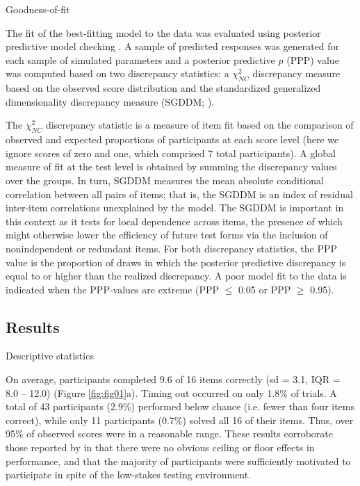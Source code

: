 \documentclass[a4paper,man,natbib]{apa6}
\makeatletter
\renewcommand{\subsubsection}{\@startsection{subsubsection}{3}
  {\z@}%
  {\b@level@two@skip}{\e@level@two@skip}%
  {\normalfont\normalsize\bfseries}}
\makeatother
\begin{document}
\subsubsection{Goodness-of-fit}

The fit of the best-fitting model to the data was evaluated using posterior predictive model checking \citep{gelman1996posterior, levy2017bayesian}. A sample of predicted responses was generated for each sample of simulated parameters and a posterior predictive $p$ (PPP) value was computed based on two discrepancy statistics: a $\chi^2_{NC}$ discrepancy measure based on the observed score distribution \citep{sinharay2006posterior} and the standardized generalized dimensionality discrepancy measure (SGDDM; \citealt{levy2015standardized}). 

The $\chi^2_{NC}$ discrepancy statistic is a measure of item fit based on the comparison of observed and expected proportions of participants at each score level (here we ignore scores of zero and one, which comprised 7 total participants). A global measure of fit at the test level is obtained by summing the discrepancy values over the groups. In turn, SGDDM measures the mean absolute conditional correlation between all pairs of items; that is, the SGDDM is an index of residual inter-item correlations unexplained by the model. The SGDDM is important in this context as it tests for local dependence across items, the presence of which might otherwise lower the efficiency of future test forms via the inclusion of nonindependent or redundant items. For both discrepancy statistics, the PPP value is the proportion of draws in which the posterior predictive discrepancy is equal to or higher than the realized discrepancy. A poor model fit to the data is indicated when the PPP-values are extreme (PPP $\leq$ 0.05 or PPP $\geq$ 0.95).

\subsection{Results}

\subsubsection{Descriptive statistics}

On average, participants completed 9.6 of 16 items correctly (sd = 3.1, IQR = 8.0 -- 12.0) (Figure \ref{fig:fig01}a). Timing out occurred on only 1.8\% of trials. A total of 43 participants (2.9\%) performed below chance (i.e. fewer than four items correct), while only 11 participants (0.7\%) solved all 16 of their items. Thus, over 95\% of observed scores were in a reasonable range. These results corroborate those reported by \cite{chierchia2019matrix} in that there were no obvious ceiling or floor effects in performance, and that the majority of participants were sufficiently motivated to participate in spite of the low-stakes testing environment.  
\end{document}

